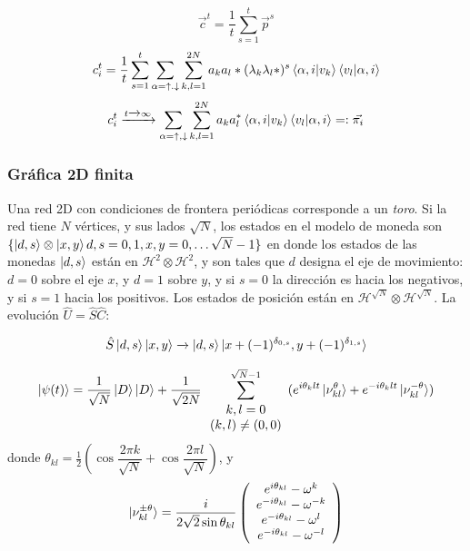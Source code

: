 \begin{equation}
    \Vec{c}^t=\frac{1}{t}\sum_{s=1}^t\Vec{p}^s
\end{equation}{}
\begin{equation}
c_i^t=\dfrac{1}{t}\sum_{s=1}^t\sum_{\alpha=\uparrow.\downarrow}\sum_{k,l=1}^{2N}a_ka_l*(\lambda_k\lambda_l*)^s\braket{\alpha,i|v_k}\braket{v_l|\alpha,i}
\end{equation}{}
\begin{equation}
    c_i^t\xrightarrow{t\xrightarrow{}\infty}\sum_{\alpha=\uparrow,\downarrow}\sum_{k,l=1}^{2N}a_ka_l^*\braket{\alpha,i|v_k}\braket{v_l|\alpha,i}=:\Vec{\pi_i}
\end{equation}{}


\subsubsection*{Gráfica 2D finita}
Una red 2D con condiciones de frontera periódicas corresponde a un \textit{toro}. Si la red tiene $N$ vértices, y sus lados $\sqrt{N}$, los estados en el modelo de moneda son $\{\ket{d,s}\otimes\ket{x,y}d,s=0,1,x,y=0,\dots \sqrt{N}-1\}$ en donde los estados de las monedas $\ket{d,s}$ están en $\mathcal{H}^2\otimes \mathcal{H}^2$, y son tales que $d$ designa el eje de movimiento: $d=0$ sobre el eje $x$, y $d=1$ sobre $y$, y si $s=0$ la dirección es hacia los negativos, y si $s=1$ hacia los positivos. Los estados de posición están en  $\mathcal{H}^{\sqrt{N}} \otimes   \mathcal{H}^{\sqrt{N}}$. La evolución $\hat{U}=\hat{S}\hat{C}$:

\begin{equation}
    \hat{S}\ket{d,s}\ket{x,y}\xrightarrow{}\ket{d,s}\ket{x+(-1)^{\delta_{0,s}},y+(-1)^{\delta_{1,s}}}
\end{equation}{}

\begin{equation}
    \ket{\psi(t)}=\dfrac{1}{\sqrt{N}}\ket{D}\ket{D}+\dfrac{1}{\sqrt{2N}}\sum_{\begin{array}{c} k,l=0\\ (k,l)\neq(0,0) \end{array}}^{\sqrt{N}-1} (e^{i\theta_klt}\ket{\nu_{kl}^{\theta}}+e^{-i\theta_klt}\ket{\nu_{kl}^{-\theta}})
\end{equation}
donde $\theta_{kl}=\frac{1}{2}(\cos{\dfrac{2\pi k}{\sqrt{N}}}+\cos{\dfrac{2\pi l}{\sqrt{N}}})$, y 
\begin{equation}
    \ket{\nu_{kl}^{\pm\theta}}=\dfrac{i}{2\sqrt{2}\sin{\theta_{kl}}}
      \left(
    \begin{array}{c}
        e^{i\theta_{kl}}-\omega^k   \\
        e^{-i\theta_{kl}}-\omega^{-k}\\
        e^{-i\theta_{kl}}-\omega^{l}\\
        e^{-i\theta_{kl}}-\omega^{-l}
    \end{array}
    \right)
\end{equation}
